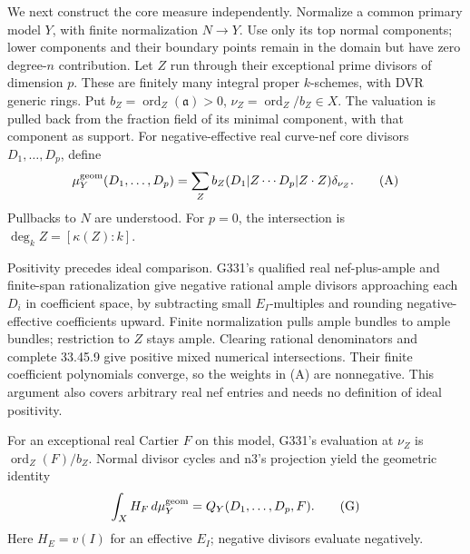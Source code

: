 We next construct the core measure independently. Normalize a common primary model \(Y\), with finite normalization \(N\to Y\). Use only its top normal components; lower components and their boundary points remain in the domain but have zero degree-\(n\) contribution. Let \(Z\) run through their exceptional prime divisors of dimension \(p\). These are finitely many integral proper \(k\)-schemes, with DVR generic rings. Put \(b_Z=\operatorname{ord}_Z(\mathfrak a)>0\), \(\nu_Z=\operatorname{ord}_Z/b_Z\in X\). The valuation is pulled back from the fraction field of its minimal component, with that component as support. For negative-effective real curve-nef core divisors \(D_1,\ldots,D_p\), define
\[
\mu_Y^{\rm geom}(D_1,\ldots,D_p)
=\sum_Z b_Z(D_1|Z\cdots D_p|Z\cdot Z)\delta_{\nu_Z}. \tag{A}
\]
Pullbacks to \(N\) are understood. For \(p=0\), the intersection is \(\deg_k Z=[\kappa(Z):k]\).

Positivity precedes ideal comparison. G331's qualified real nef-plus-ample and finite-span rationalization give negative rational ample divisors approaching each \(D_i\) in coefficient space, by subtracting small \(E_I\)-multiples and rounding negative-effective coefficients upward. Finite normalization pulls ample bundles to ample bundles; restriction to \(Z\) stays ample. Clearing rational denominators and complete 33.45.9 give positive mixed numerical intersections. Their finite coefficient polynomials converge, so the weights in (A) are nonnegative. This argument also covers arbitrary real nef entries and needs no definition of ideal positivity.

For an exceptional real Cartier \(F\) on this model, G331's evaluation at \(\nu_Z\) is \(\operatorname{ord}_Z(F)/b_Z\). Normal divisor cycles and n3's projection yield the geometric identity
\[
\int_X H_F\,d\mu_Y^{\rm geom}=Q_Y(D_1,\ldots,D_p,F). \tag{G}
\]
Here \(H_E=v(I)\) for an effective \(E_I\); negative divisors evaluate negatively.

